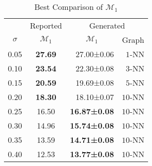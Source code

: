 \documentclass[a4paper, 10pt]{article}
\begin{document}
\begin{minipage}{0.47\linewidth}
	\begin{table}[H]
		\small
		\centering{}
		\caption{Best Comparison of \(\mathcal{M}_1\)}\label{tab:best:m1}
		\begin{tabular}{ccrr}\toprule
			            & Reported          & \multicolumn{2}{c}{Generated}                                     \\ \cmidrule(l){2-2}\cmidrule(l){3-4}
			\(\sigma \) & \(\mathcal{M}_1\) & \multicolumn{1}{c}{\(\mathcal{M}_1\)} & \multicolumn{1}{c}{Graph} \\ \midrule
			0.05        & \textbf{27.69}    & 27.00±0.06                            & \(1\)-NN                  \\
			0.10        & \textbf{23.54}    & 22.30±0.08                            & \(3\)-NN                  \\
			0.15        & \textbf{20.59}    & 19.69±0.08                            & \(5\)-NN                  \\
			0.20        & \textbf{18.30}    & 18.10±0.07                            & \(10\)-NN                 \\
			0.25        & 16.50             & \textbf{16.87±0.08}                   & \(10\)-NN                 \\
			0.30        & 14.96             & \textbf{15.74±0.08}                   & \(10\)-NN                 \\
			0.35        & 13.59             & \textbf{14.71±0.08}                   & \(10\)-NN                 \\
			0.40        & 12.53             & \textbf{13.77±0.08}                   & \(10\)-NN                 \\
			\bottomrule
		\end{tabular}
	\end{table}
\end{minipage}
\end{document}
